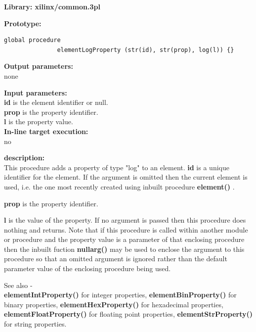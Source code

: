             {\bf Library: xilinx/common.3pl}

            {\bf Prototype:} \\
            \vsp
            \begin{lstlisting}[gobble=12, language=threepl]
               global procedure
               elementLogProperty (str(id), str(prop), log(l)) {}
            \end{lstlisting}

            {\bf Output parameters:} \\
            none

            {\bf Input parameters:} \\            
            {\bf id} is the element identifier or null.\\
            {\bf prop} is the property identifier.\\
            {\bf l} is the property value.\\
        
            {\bf In-line target execution:} \\
            no

            {\bf description:} \\
            This procedure adds a property of type "log" to an element.
            {\bf id} is a unique identifier for the element. If the argument is
            omitted then the current element is used, i.e. the one most recently
            created using inbuilt procedure {\bf element()} .
            
            {\bf prop} is the property identifier.
            
            {\bf l} is the value of the property. If no argument is passed then
            this procedure does nothing and returns. Note that if this procedure
            is called within another module or procedure and the property
            value is a parameter of that enclosing procedure then the inbuilt
            fuction {\bf nullarg()}  may be used to enclose the
            argument to this procedure so that an omitted argument is ignored rather
            than the default parameter value of the enclosing procedure being used.
            
            See also - \\
            {\bf elementIntProperty()}  for integer properties,
            {\bf elementBinProperty()}  for binary properties,
            {\bf elementHexProperty()}  for hexadecimal properties,
            {\bf elementFloatProperty()}  for floating point properties,
            {\bf elementStrProperty()}  for string properties.






